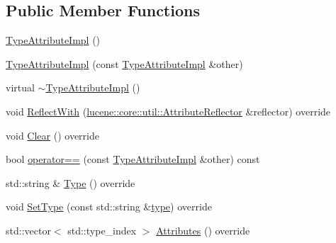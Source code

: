 \subsection*{Public Member Functions}
\begin{DoxyCompactItemize}
\item 
\mbox{\hyperlink{classlucene_1_1core_1_1analysis_1_1tokenattributes_1_1TypeAttributeImpl_a49d2f823e9f9e40eaf4778ca6c891004}{Type\+Attribute\+Impl}} ()
\item 
\mbox{\hyperlink{classlucene_1_1core_1_1analysis_1_1tokenattributes_1_1TypeAttributeImpl_ac175daf0cfddc86eab6614ff77407535}{Type\+Attribute\+Impl}} (const \mbox{\hyperlink{classlucene_1_1core_1_1analysis_1_1tokenattributes_1_1TypeAttributeImpl}{Type\+Attribute\+Impl}} \&other)
\item 
virtual \mbox{\hyperlink{classlucene_1_1core_1_1analysis_1_1tokenattributes_1_1TypeAttributeImpl_abdcbb50bdbabafbee791c5fc9fa0e14d}{$\sim$\+Type\+Attribute\+Impl}} ()
\item 
void \mbox{\hyperlink{classlucene_1_1core_1_1analysis_1_1tokenattributes_1_1TypeAttributeImpl_a7194a1e268786f0a45e77b1204246727}{Reflect\+With}} (\mbox{\hyperlink{namespacelucene_1_1core_1_1util_a7dbb701adaed055f73fb95eec83da10a}{lucene\+::core\+::util\+::\+Attribute\+Reflector}} \&reflector) override
\item 
void \mbox{\hyperlink{classlucene_1_1core_1_1analysis_1_1tokenattributes_1_1TypeAttributeImpl_a373559195f408497ab81408bab95a2b1}{Clear}} () override
\item 
bool \mbox{\hyperlink{classlucene_1_1core_1_1analysis_1_1tokenattributes_1_1TypeAttributeImpl_a7cce374ec3d71e3ea220a7d8f8a33aef}{operator==}} (const \mbox{\hyperlink{classlucene_1_1core_1_1analysis_1_1tokenattributes_1_1TypeAttributeImpl}{Type\+Attribute\+Impl}} \&other) const
\item 
std\+::string \& \mbox{\hyperlink{classlucene_1_1core_1_1analysis_1_1tokenattributes_1_1TypeAttributeImpl_a612a5d915d4f189c5c4563f1a2358253}{Type}} () override
\item 
void \mbox{\hyperlink{classlucene_1_1core_1_1analysis_1_1tokenattributes_1_1TypeAttributeImpl_a237875b669558ea7d58b6fa0b46a16a1}{Set\+Type}} (const std\+::string \&\mbox{\hyperlink{classlucene_1_1core_1_1analysis_1_1tokenattributes_1_1TypeAttributeImpl_ad5781cf6585610066317c74d5d4a4f1c}{type}}) override
\item 
std\+::vector$<$ std\+::type\+\_\+index $>$ \mbox{\hyperlink{classlucene_1_1core_1_1analysis_1_1tokenattributes_1_1TypeAttributeImpl_ae7ba4a6e94fb4f1d1c8111e613793d59}{Attributes}} () override

\end{DoxyCompactItemize}
